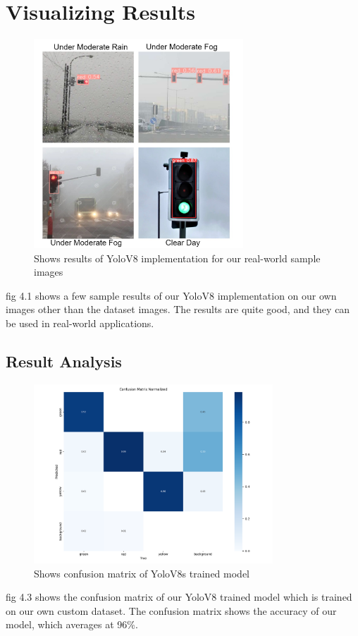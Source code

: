 \documentclass[12 pt]{report}
\begin{document}
\section{Visualizing Results}
 {
  \begin{figure}[h]
    \centering
    \includegraphics[width=0.7\textwidth]{Results-Collgess.jpg}
    \caption{Shows results of YoloV8 implementation for our real-world sample images}
    \label{fig:Results achieved from YoloV8s implementation}
  \end{figure}
  \justify
  \hspace*{1cm} fig 4.1 shows a few sample results of our YoloV8 implementation on our own images other than the dataset images. The results are quite good, and they can be used in real-world applications.
  \newpage
  \subsection{Result Analysis}
  {
    \begin{figure}[h]
      \centering
      \includegraphics[width=0.8\textwidth]{confusion_matrix_normalized.png}
      \caption{Shows confusion matrix of YoloV8s trained model}
      \label{fig:Confusion Matrix YoloV8 Trained Model}
    \end{figure}
    \justify
    \hspace*{1cm} fig 4.3 shows the confusion matrix of our YoloV8 trained model which is trained on our own custom dataset. The confusion matrix shows the accuracy of our model, which averages at 96\%.

}}
\end{document}

